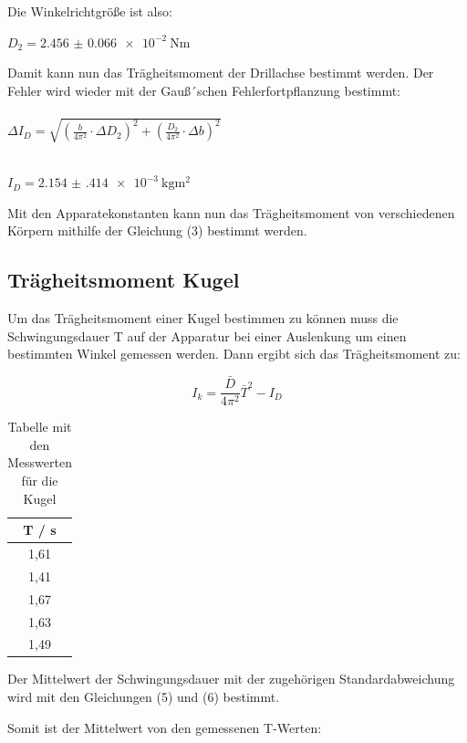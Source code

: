 Die Winkelrichtgröße ist also:

\centerline{$D_2 = \SI{2.456(66)e-2}{\N\meter}$}

Damit kann nun das Trägheitsmoment der Drillachse bestimmt werden. Der Fehler wird
wieder mit der Gauß´schen Fehlerfortpflanzung bestimmt:\\\\

$\Delta I_D = \sqrt{\left(\frac{b}{4\pi^2} \cdot \Delta D_2 \right)^2 +
\left(\frac{D_2}{4\pi^2} \cdot \Delta b \right)^2}$\\\\

\centerline{$I_D = \SI{2.154(414)e-3}{\kilo\gram\meter\squared}$}

Mit den Apparatekonstanten kann nun das Trägheitsmoment von verschiedenen Körpern
mithilfe der Gleichung (3) bestimmt werden.


\subsection{Trägheitsmoment Kugel}

Um das Trägheitsmoment einer Kugel bestimmen zu können muss die Schwingungsdauer T
auf der Apparatur bei einer Auslenkung um einen bestimmten Winkel gemessen werden.
Dann ergibt sich das Trägheitsmoment zu:

\begin{equation}
  I_k = \frac{\bar{D}}{4\pi^2}\bar{T}^2 - I_D
\end{equation}

\begin{table}[H]
  \centering
  \caption{Tabelle mit den Messwerten für die Kugel}
  \begin{tabular}{c}
    \toprule
    T / \si{\second} \\
    \midrule
    1,61 \\
    1,41 \\
    1,67 \\
    1,63 \\
    1,49 \\
    \bottomrule
  \end{tabular}
\end{table}

Der Mittelwert der Schwingungsdauer mit der zugehörigen Standardabweichung
wird mit den Gleichungen (5) und (6) bestimmt.

 Somit ist der Mittelwert von den gemessenen T-Werten:\\\\

